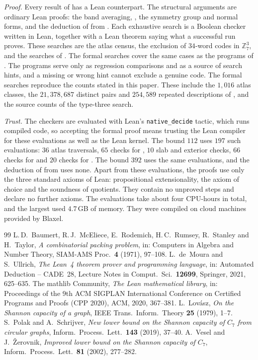 \documentclass[11pt,colorlinks]{charlie}
\newcommand{\Zs}{\mathbb{Z}_7}
\begin{document}
\emph{Proof.} Every result of  has a Lean counterpart. The structural arguments are ordinary Lean proofs: the band averaging, , the symmetry group and normal forms, and the deduction of  from . Each exhaustive search is a Boolean checker written in Lean, together with a Lean theorem saying what a successful run proves. These searches are the atlas census, the exclusion of $34$-word codes in $\Zs^3$, and the searches of . The formal searches cover the same cases as the programs of . The programs serve only as regression comparisons and as a source of search hints, and a missing or wrong hint cannot exclude a genuine code. The formal searches reproduce the counts stated in this paper. These include the $1{,}016$ atlas classes, the $21{,}378{,}687$ distinct pairs and $254{,}589$ repeated descriptions of , and the source counts of the type-three search.

\emph{Trust.} The checkers are evaluated with Lean's \texttt{native\_decide} tactic, which runs compiled code, so accepting the formal proof means trusting the Lean compiler for these evaluations as well as the Lean kernel. The bound $112$ uses $197$ such evaluations: $36$ atlas traversals, $65$ checks for , $10$ slab and exterior checks, $66$ checks for  and $20$ checks for . The bound $392$ uses the same evaluations, and the deduction of  from  uses none. Apart from these evaluations, the proofs use only the three standard axioms of Lean: propositional extensionality, the axiom of choice and the soundness of quotients. They contain no unproved steps and declare no further axioms. The evaluations take about four CPU-hours in total, and the largest used $4.7$\,GB of memory. They were compiled on cloud machines provided by Blaxel.

\begin{thebibliography}{99}\small
{} L.\,D.~Baumert, R.\,J.~McEliece, E.~Rodemich, H.\,C.~Rumsey, R.~Stanley and H.~Taylor, \emph{A combinatorial packing problem}, in: Computers in Algebra and Number Theory, SIAM-AMS Proc.\ \textbf{4} (1971), 97--108.
 L.~de~Moura and S.~Ullrich, \emph{The Lean~4 theorem prover and programming language}, in: Automated Deduction -- CADE~28, Lecture Notes in Comput.\ Sci.\ \textbf{12699}, Springer, 2021, 625--635.
 The mathlib Community, \emph{The Lean mathematical library}, in: Proceedings of the 9th ACM SIGPLAN International Conference on Certified Programs and Proofs (CPP 2020), ACM, 2020, 367--381.
 L.~Lov\'asz, \emph{On the Shannon capacity of a graph}, IEEE Trans.\ Inform.\ Theory \textbf{25} (1979), 1--7.
 S.~Polak and A.~Schrijver, \emph{New lower bound on the Shannon capacity of $C_7$ from circular graphs}, Inform.\ Process.\ Lett.\ \textbf{143} (2019), 37--40.
 A.~Vesel and J.~\v{Z}erovnik, \emph{Improved lower bound on the Shannon capacity of $C_7$}, Inform.\ Process.\ Lett.\ \textbf{81} (2002), 277--282.
\end{thebibliography}
\end{document}
